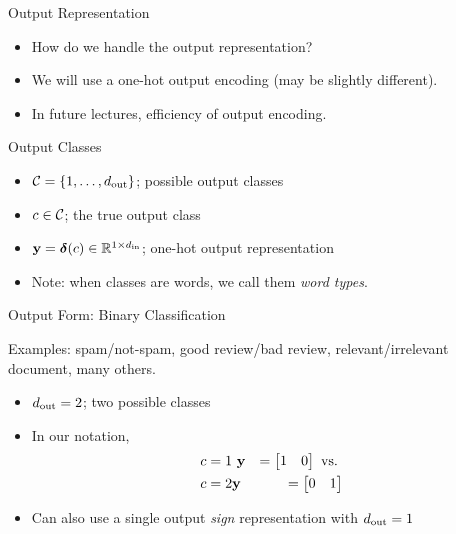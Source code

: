 \documentclass{beamer}
\begin{document}
\begin{frame}{Output Representation}
  \begin{itemize}
  \item How do we handle the output representation?
  \item We will use a one-hot output encoding (may be slightly different).
  \item In future lectures, efficiency of output encoding.
  \end{itemize}
\end{frame}




\begin{frame}{Output Classes}
  \begin{itemize}
  \item $\mathcal{C} = \{1, \ldots, {d_{\mathrm{out}}}\}$; possible output classes
  \item $c \in \mathcal{C}$; the true output class 
  \item $\mathbf{y} = \boldsymbol{\delta}(c) \in \mathbb{R}^{1\times {d_{\mathrm{in}}}}$; one-hot output representation

  \item Note: when classes are words, we call them \textit{word types}. 
  \end{itemize}
\end{frame}

\begin{frame}{Output Form: Binary Classification}

  Examples: spam/not-spam, good review/bad review, relevant/irrelevant document, many others.   
  \begin{itemize}
  \item ${d_{\mathrm{out}}} = 2$; two possible classes
  \item In our notation,
    \begin{eqnarray*} 
    c = 1 & \  \mathbf{y} &= \begin{bmatrix} 1 & 0  \end{bmatrix}  \mathrm {\ vs. \ } \\
    c = 2 & \mathbf{y} &= \begin{bmatrix} 0  & 1  \end{bmatrix} 
   \end{eqnarray*} 
   \item Can also use a single output \textit{sign} representation with ${d_{\mathrm{out}}} = 1$ 
  \end{itemize}

\end{frame}
\end{document}
